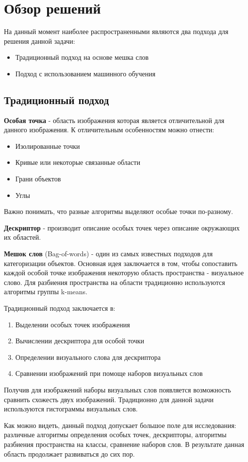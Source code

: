 \documentclass[12pt, specialist, subf, substylefile = spbu.rtx]{disser}
\begin{document}
\newpage
\section{Обзор решений}
На данный момент наиболее распространенными являются два подхода для решения данной задачи:
\begin{itemize}
    \item Традиционный подход на основе мешка слов
    \item Подход с использованием машинного обучения
\end{itemize}

\subsection{Традиционный подход}


\textbf{Особая точка} - область изображения которая является отличительной для данного изображения. К отличительным особенностям можно отнести: 
\begin{itemize}
    \item Изолированные точки
    \item Кривые или некоторые связанные области
    \item Грани объектов
    \item Углы
\end{itemize}
Важно понимать, что разные алгоритмы выделяют особые точки по-разному.
\par \textbf{Дескриптор} - производит описание особых точек через описание окружающих их областей.
\par \textbf{Мешок слов} (Bag-of-words) - один из самых известных подходов для категоризации объектов. Основная идея заключается в том, чтобы сопоставить каждой особой точке изображения некоторую область пространства - визуальное слово. Для разбиения пространства на области традиционно используются алгоритмы группы k-means. 

Традиционный подход заключается в:
\begin{enumerate}
    \item Выделении особых точек изображения
    \item Вычислении дескриптора для особой точки
    \item Определении визуального слова для дескриптора
    \item Сравнении изображений при помоще наборов визуальных слов
\end{enumerate}

\par Получив для изображений наборы визуальных слов появляется возможность сравнить схожесть двух изображений. Традиционно для данной задачи используются гистограммы визуальных слов.
\par Как можно видеть, данный подход допускает большое поле для исследования: различные алгоритмы определения особых точек, дескрипторы, алгоритмы разбиения пространства на классы, сравнение наборов слов. В результате данная область продолжает развиваться до сих пор.
\end{document}
